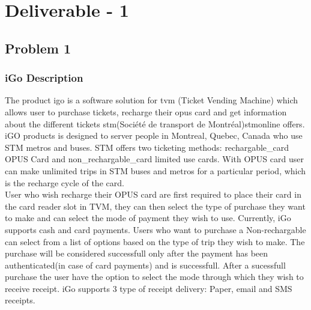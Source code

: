 \documentclass[a4paper,12pt]{report}
\begin{document}

\newpage

\tableofcontents




\chapter*{\centering Deliverable - 1}



%
%

\section{Problem 1}
\subsection{iGo Description}
The product \gls{igo} is a software solution for \gls{tvm} (Ticket Vending Machine) which allows user to purchase tickets, recharge their \gls{opus} card and get information about the different tickets \gls{stm}(Société de transport de Montréal){stmonline} offers. iGO products is designed to server people in Montreal, Quebec, Canada who use STM metros and buses. STM offers two ticketing methods: \gls{rechargable_card} OPUS Card and \gls{non_rechargable_card} limited use cards. With OPUS card user can make unlimited trips in STM buses and metros for a particular period, which is the recharge cycle of the card. \\


User who wish recharge their OPUS card are first required to place their card in the card reader slot in TVM, they can then select the type of purchase they want to make and can select the mode of payment they wish to use. Currently, iGo supports cash and card payments. Users who want to purchase a Non-rechargable can select from a list of options based on the type of trip they wish to make. The purchase will be considered successfull only after the payment has been authenticated(in case of card payments) and is successfull. After a sucessfull purchase the user have the option to select the mode through which they wish to receive receipt. iGo supports 3 type of receipt delivery: Paper, email and SMS receipts. \\
\end{document}
